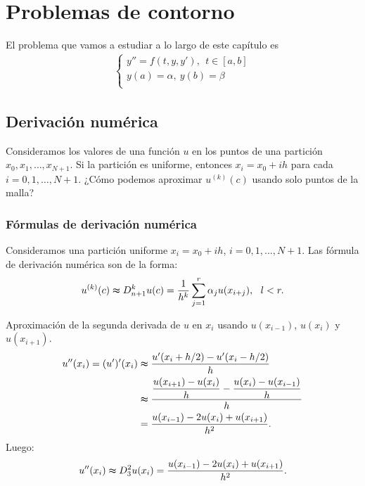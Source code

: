 \chapter{Problemas de contorno}
\noindent El problema que vamos a estudiar a lo largo de este capítulo es
\begin{align*}
    \left\{ \begin{array}{lcc}
             y'' = f(t,y,y'), \ \ t \in [a,b]\\
             y(a) = \alpha, \ y(b) = \beta \\
             \end{array}
   \right.
\end{align*}

\section{Derivación numérica}

\noindent Consideramos los valores de una función $u$ en los puntos de una partición $x_0,x_1,\ldots,x_{N+1}$. Si la partición es uniforme, entonces $x_i = x_0 + ih$ para cada $i = 0,1,\ldots,N+1$. ¿Cómo podemos aproximar $u^{(k)}(c)$ usando solo puntos de la malla?

\subsection{Fórmulas de derivación numérica}
\noindent Consideramos una partición uniforme $x_i = x_0 + ih$, $i = 0,1,\ldots,N+1$. Las fórmula de derivación numérica son de la forma:
\begin{align*}
    u^{(k)}(c) \thickapprox D^k_{n+1}u(c) = \frac{1}{h^k} \sum_{j=1}^{r} \alpha_j u(x_{i+j}), \ \ l < r.
\end{align*}

\begin{ejemplo}
Aproximación de la segunda derivada de $u$ en $x_i$ usando $u(x_{i-1})$, $u(x_i)$ y $u(x_{i+1})$.
\begin{align*}
    u''(x_i) = (u')'(x_i) &\thickapprox \frac{u'(x_i + h/2) - u'(x_i -h/2)}{h} \\
    & \thickapprox \frac{\dfrac{u(x_{i+1}) - u(x_i)}{h} - \dfrac{u(x_i) - u(x_{i-1})}{h}}{h} \\
    &= \frac{u(x_{i-1}) - 2u(x_i) +u(x_{i+1})}{h^2}.
\end{align*}
Luego:
\begin{align*}
    u''(x_i) \thickapprox D^2_3u(x_i) = \frac{u(x_{i-1}) - 2u(x_i) +u(x_{i+1})}{h^2}.
\end{align*}
\end{ejemplo}

